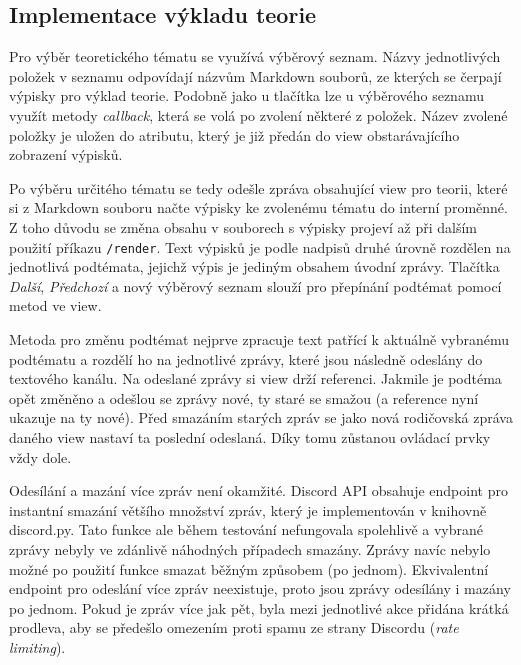 \documentclass[FM]{tulthesis}
\begin{document}
	
	\subsection{Implementace výkladu teorie}


	Pro výběr teoretického tématu se využívá výběrový seznam. Názvy jednotlivých položek v seznamu odpovídají názvům Markdown souborů, ze kterých se čerpají výpisky pro výklad teorie. Podobně jako u tlačítka lze u výběrového seznamu využít metody \textit{callback}, která se volá po zvolení některé z položek. Název zvolené položky je uložen do atributu, který je již předán do view obstarávajícího zobrazení výpisků.%
	
	Po výběru určitého tématu se tedy odešle zpráva obsahující view pro teorii, které si z Markdown souboru načte výpisky ke zvolenému tématu do interní proměnné. Z toho důvodu se změna obsahu v souborech s výpisky projeví až při dalším použití příkazu \verb*|/render|. Text výpisků je podle nadpisů druhé úrovně rozdělen na jednotlivá podtémata, jejichž výpis je jediným obsahem úvodní zprávy. Tlačítka \textit{Další}, \textit{Předchozí} a nový výběrový seznam slouží pro přepínání podtémat pomocí metod ve view.
	
	Metoda pro změnu podtémat nejprve zpracuje text patřící k aktuálně vybranému podtématu a rozdělí ho na jednotlivé zprávy, které jsou následně odeslány do textového kanálu. Na odeslané zprávy si view drží referenci. Jakmile je podtéma opět změněno a odešlou se zprávy nové, ty staré se smažou (a reference nyní ukazuje na ty nové). Před smazáním starých zpráv se jako nová rodičovská zpráva daného view nastaví ta poslední odeslaná. Díky tomu zůstanou ovládací prvky vždy dole.
	
	Odesílání a mazání více zpráv není okamžité. Discord API obsahuje endpoint pro instantní smazání většího množství zpráv, který je implementován v knihovně discord.py. Tato funkce ale během testování nefungovala spolehlivě a vybrané zprávy nebyly ve zdánlivě náhodných případech smazány. Zprávy navíc nebylo možné po použití funkce smazat běžným způsobem (po jednom). Ekvivalentní endpoint pro odeslání více zpráv neexistuje, proto jsou zprávy odesílány i mazány po jednom. Pokud je zpráv více jak pět, byla mezi jednotlivé akce přidána krátká prodleva, aby se předešlo omezením proti spamu ze strany Discordu (\textit{rate limiting}).
		
\end{document}
